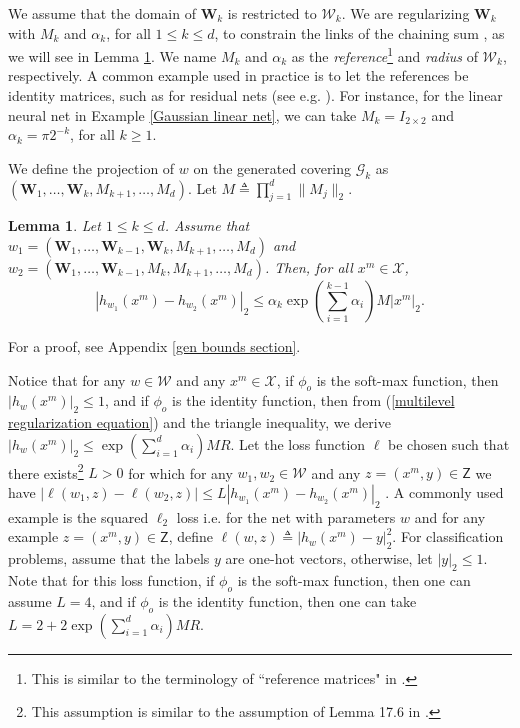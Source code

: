 \documentclass{article}
\newtheorem{lemma}{Lemma}
\newcommand{\W}[0]{\mathcal{W}}
\newcommand{\Z}[0]{\mathsf{Z}}
\newcommand{\G}{\mathcal{G}}
\begin{document}
	We assume that the domain of $\mathbf{W}_k$ is restricted to $\mathcal{W}_k$. We are regularizing $\mathbf{W}_k$ with $M_k$ and $\alpha_k$, for all $1\leq k \leq d$, to constrain the 
	links of the chaining sum
	, as we will see in Lemma \ref{chaining link distance}. We name $M_k$ and $\alpha_k$ as the \emph{reference}\footnote{This is similar to the terminology of ``reference matrices" in \cite{bartlett2017spectrally}.} and \emph{radius} of $\mathcal{W}_k$, respectively. A common example used in practice is to let the references be identity matrices, such as for residual nets (see e.g. \cite{hardt2016identity, bartlett2018representing, bartlett2017spectrally}). For instance, for the linear neural net in Example \ref{Gaussian linear net}, we can take $M_k=I_{2\times 2}$ and $\alpha_k=\pi 2^{-k}$, for all $k\geq 1$.  
	
	We define the projection of $w$ on the generated covering $\G_k$ as $(\mathbf{W}_1,\dots,\mathbf{W}_k,M_{k+1},\dots,M_d)$. Let $M\triangleq \prod_{j=1}^{d} \|M_j\|_2$.
	\begin{lemma}\label{chaining link distance} Let $1\leq k\leq d$. Assume that $w_1=(\mathbf{W}_1,\dots,\mathbf{W}_{k-1},\mathbf{W}_k,M_{k+1},\dots,M_d)$ and $w_2=(\mathbf{W}_1,\dots,\mathbf{W}_{k-1},M_k,M_{k+1},\dots,M_d)$. Then, for all $x^m\in \mathcal{X}$,
	\begin{equation}
		|h_{w_1}(x^m)-h_{w_2}(x^m)|_2 \leq \alpha_k\exp\left(\sum_{i=1}^{k-1} \alpha_i\right) M|x^m|_2.\nonumber
	\end{equation}
\end{lemma} 
For a proof, see Appendix \ref{gen bounds section}.

Notice that for any $w\in \W$ and any $x^m\in \mathcal{X}$, if $\phi_o$ is the soft-max function, then $|h_w(x^m)|_2\leq 1$, and if $\phi_o$ is the identity function, then from (\ref{multilevel regularization equation}) and the triangle inequality, we derive $|h_w(x^m)|_2\leq \exp\left(\sum_{i=1}^d \alpha_i\right)MR$.
	Let the loss function $\ell$ be chosen such that there exists\footnote{This assumption is similar to the assumption of Lemma 17.6 in \cite{anthony2009neural}.} $L>0$ for which for any $w_1,w_2\in \W$ and any $z=(x^m,y)\in \Z$ we have
	$|\ell(w_1,z)-\ell(w_2,z)|\leq L|h_{w_1}(x^m)-h_{w_2}(x^m)|_2$ 
	. A commonly used example is the squared $\ell_2$ loss 
	i.e. for the net with parameters $w$ and for any example $z=(x^m,y)\in \mathsf{Z}$, define
	$
		\ell(w,z)\triangleq |h_w(x^m)-y|_2^2
	$.
For classification problems, assume that the labels $y$ are one-hot vectors, otherwise, let $|y|_2\leq 1$.
	Note that for this loss function, if $\phi_o$ is the soft-max function, then one can assume $L=4$, and if $\phi_o$ is the identity function, then one can take $L=2+2\exp\left(\sum_{i=1}^d \alpha_i\right)MR$.
\end{document}

